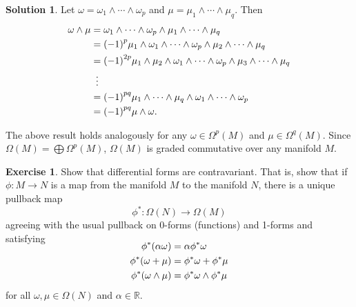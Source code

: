 \documentclass[11pt, a4paper]{report}
\theoremstyle{definition}
\newtheorem{exercise}{Exercise}[part]
\newtheorem{solution}{Solution}[part]
\newenvironment{ex}{\begin{exercise}}{\end{exercise}\pagebreak[1]}
\newenvironment{sol}{\begin{solution}}{\end{solution}\pagebreak[3]}
\begin{document}
\begin{sol}

Let $\omega = \omega_1 \wedge \cdots \wedge \omega_p$ and $\mu = \mu_1 \wedge \cdots \wedge \mu_q$.
Then
\begin{align*}
    \omega \wedge \mu &= \omega_1 \wedge \cdots \wedge \omega_p \wedge \mu_1 \wedge \cdots \wedge \mu_q \\
        &= {(-1)}^p \mu_1 \wedge \omega_1 \wedge \cdots \wedge \omega_p \wedge \mu_2 \wedge \cdots \wedge \mu_q \\
        &= {(-1)}^{2p} \mu_1 \wedge \mu_2 \wedge \omega_1 \wedge \cdots \wedge \omega_p \wedge \mu_3 \wedge \cdots \wedge \mu_q \\
        &\vdotswithin{=} \\
        &= {(-1)}^{pq} \mu_1 \wedge \cdots \wedge \mu_q \wedge \omega_1 \wedge \cdots \wedge \omega_p \\
        &= {(-1)}^{pq} \mu \wedge \omega.
\end{align*}

The above result holds analogously for any $\omega \in \Omega^p(M)$ and $\mu \in \Omega^q(M)$. Since $\Omega(M) = \bigoplus \Omega^p(M)$, $\Omega(M)$ is graded commutative over any manifold $M$.

\end{sol}

\begin{ex}

Show that differential forms are contravariant. That is, show that if $\phi: M \to N$ is a map from the manifold $M$ to the manifold $N$, there is a unique pullback map
\[
    \phi^*: \Omega(N) \to \Omega(M)
\]
agreeing with the usual pullback on 0-forms (functions) and 1-forms and satisfying
\begin{align*}
    \SwapAboveDisplaySkip
    \phi^* (\alpha \omega) &= \alpha \phi^* \omega \\
    \phi^*(\omega + \mu) &= \phi^* \omega + \phi^* \mu \\
    \phi^*(\omega \wedge \mu) &= \phi^* \omega \wedge \phi^* \mu
\end{align*}
for all $\omega, \mu \in \Omega(N)$ and $\alpha \in \mathbb{R}$.

\end{ex}
\end{document}
